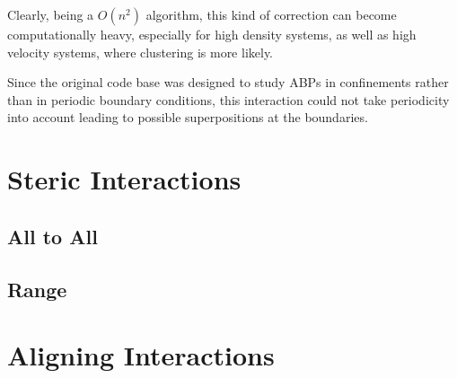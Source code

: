 \documentclass[../master_thesis_np.tex]{subfiles}
\begin{document}
	Clearly, being a $O(n^2)$ algorithm, this kind of correction can become computationally heavy, especially for high density systems, as well as high velocity systems, where clustering is more likely.
	
	Since the original code base was designed to study ABPs in confinements rather than in periodic boundary conditions, this interaction could not take periodicity into account leading to possible superpositions at the boundaries.

	\section{Steric Interactions}
	\subsection{All to All}
	\subsection{Range}
	\section{Aligning Interactions}
\end{document}
